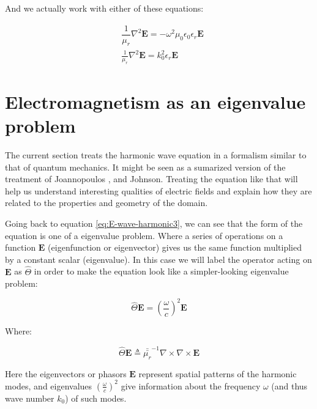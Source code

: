 And we actually work with either of these equations:

\begin{align}
&\dfrac{1}{\mu_r}\nabla^2 \mathbf{E} = -\omega^2\mu_0\epsilon_0\epsilon_r \mathbf{E} \\
&\frac{1}{\mu_r}\nabla^2 \mathbf{E} = k_0^{2}\epsilon_r \mathbf{E} \label{eq:E-wave-harmonic3}
\end{align}

\section{Electromagnetism as an eigenvalue problem}

The current section treats the harmonic wave equation in a formalism similar to that of quantum mechanics. It might be seen as a sumarized version of the treatment of Joannopoulos \cite{Joannopoulos2008}, and Johnson\cite{StevenJohnson2001}. Treating the equation like that will help us understand interesting qualities of electric fields and explain how they are related to the properties and geometry of the domain.

Going back to equation \ref{eq:E-wave-harmonic3}, we can see that the form of the equation is one of a eigenvalue problem. Where a series of operations on a function $\mathbf{E}$ (eigenfunction or eigenvector) gives us the same function multiplied by a constant scalar (eigenvalue).
In this case we will label the operator acting on $\mathbf{E}$ as $\hat{\Theta}$ in order to make the equation look like a simpler-looking eigenvalue problem:

\begin{equation}
\hat{\Theta}\mathbf{E} = \left(\frac{\omega}{c}\right)^2\mathbf{E}
\label{eq:simple_eigproblem}
\end{equation} 

Where:

\begin{equation}
\hat{\Theta}\mathbf{E}\triangleq \bar{\bar{\mu_r}}^{-1}\nabla\times\nabla\times \mathbf{E}
\end{equation}

Here the eigenvectors or phasors $\mathbf{E}$ represent spatial patterns of the harmonic modes, and eigenvalues $ \left( \frac{\omega}{c}\right)^2$ give information about the frequency $\omega$ (and thus wave number $k_0$) of such modes.
